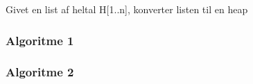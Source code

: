 Givet en list af heltal H[1..n], konverter listen til en heap
\subsubsection{Algoritme 1}


\subsubsection{Algoritme 2}
